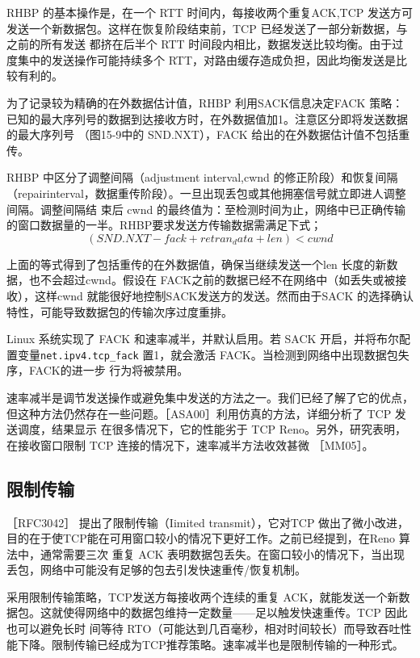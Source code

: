 RHBP 的基本操作是，在一个 RTT 时间内，每接收两个重复ACK,TCP 发送方可发送一个新数据包。这样在恢复阶段结束前，TCP 已经发送了一部分新数据，与之前的所有发送
都挤在后半个 RTT 时间段内相比，数据发送比较均衡。由于过度集中的发送操作可能持续多个 RTT，对路由缓存造成负担，因此均衡发送是比较有利的。

为了记录较为精确的在外数据估计值，RHBP 利用SACK信息决定FACK 策略：已知的最大序列号的数据到达接收方时，在外数据值加1。注意区分即将发送数据的最大序列号
（图15-9中的 SND.NXT），FACK 给出的在外数据估计值不包括重传。

RHBP 中区分了调整间隔（adjustment interval,cwnd 的修正阶段）和恢复间隔（repairinterval，数据重传阶段）。一旦出现丢包或其他拥塞信号就立即进人调整间隔。调整间隔结
束后 cwnd 的最终值为：至检测时间为止，网络中已正确传输的窗口数据量的一半。RHBP要求发送方传输数据需满足下式；
\begin{equation}
    (SND.NXT - fack + retran_ data + len) < cwnd
\end{equation}

上面的等式得到了包括重传的在外数据值，确保当继续发送一个len 长度的新数据，也不会超过cwnd。假设在 FACK之前的数据已经不在网络中（如丢失或被接收），这样cwnd
就能很好地控制SACK发送方的发送。然而由于SACK 的选择确认特性，可能导致数据包的传输次序过度重排。

Linux 系统实现了 FACK 和速率减半，并默认启用。若 SACK 开启，并将布尔配置变量\verb|net.ipv4.tcp_fack| 置1，就会激活 FACK。当检测到网络中出现数据包失序，FACK的进一步
行为将被禁用。

速率减半是调节发送操作或避免集中发送的方法之一。我们已经了解了它的优点，但这种方法仍然存在一些问题。［ASA00］利用仿真的方法，详细分析了 TCP 发送调度，结果显示
在很多情况下，它的性能劣于 TCP Reno。另外，研究表明，在接收窗口限制 TCP 连接的情况下，速率减半方法收效甚微 ［MM05］。

\subsection{限制传输}
［RFC3042］ 提出了限制传输（Iimited transmit），它对TCP 做出了微小改进，目的在于使TCP能在可用窗口较小的情况下更好工作。之前已经提到，在Reno 算法中，通常需要三次
重复 ACK 表明数据包丢失。在窗口较小的情况下，当出现丢包，网络中可能没有足够的包去引发快速重传/恢复机制。

采用限制传输策略，TCP发送方每接收两个连续的重复 ACK，就能发送一个新数据包。这就使得网络中的数据包维持一定数量——足以触发快速重传。TCP 因此也可以避免长时
间等待 RTO（可能达到几百毫秒，相对时间较长）而导致吞吐性能下降。限制传输已经成为TCP推荐策略。速率减半也是限制传输的一种形式。

